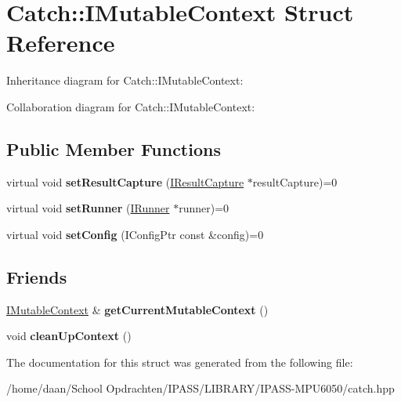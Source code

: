 \hypertarget{structCatch_1_1IMutableContext}{}\section{Catch\+:\+:I\+Mutable\+Context Struct Reference}
\label{structCatch_1_1IMutableContext}


Inheritance diagram for Catch\+:\+:I\+Mutable\+Context\+:


Collaboration diagram for Catch\+:\+:I\+Mutable\+Context\+:
\subsection*{Public Member Functions}
\begin{DoxyCompactItemize}
\item 
\mbox{\label{structCatch_1_1IMutableContext_a4a80afd0525b7def21bee8d9b48f2d39}} 
virtual void {\bfseries set\+Result\+Capture} (\hyperlink{structCatch_1_1IResultCapture}{I\+Result\+Capture} $\ast$result\+Capture)=0
\item 
\mbox{\label{structCatch_1_1IMutableContext_af2e53b1dea4527a2587cff266a730f6e}} 
virtual void {\bfseries set\+Runner} (\hyperlink{structCatch_1_1IRunner}{I\+Runner} $\ast$runner)=0
\item 
\mbox{\label{structCatch_1_1IMutableContext_aa81ba080fce084e9482f20338bc88531}} 
virtual void {\bfseries set\+Config} (I\+Config\+Ptr const \&config)=0
\end{DoxyCompactItemize}
\subsection*{Friends}
\begin{DoxyCompactItemize}
\item 
\mbox{\label{structCatch_1_1IMutableContext_aea4b25692aaf4397cdf630716976f6b8}} 
\hyperlink{structCatch_1_1IMutableContext}{I\+Mutable\+Context} \& {\bfseries get\+Current\+Mutable\+Context} ()
\item 
\mbox{\label{structCatch_1_1IMutableContext_ac07cdb7d744cc8f09672d924324b55fd}} 
void {\bfseries clean\+Up\+Context} ()
\end{DoxyCompactItemize}


The documentation for this struct was generated from the following file\+:\begin{DoxyCompactItemize}
\item 
/home/daan/\+School Opdrachten/\+I\+P\+A\+S\+S/\+L\+I\+B\+R\+A\+R\+Y/\+I\+P\+A\+S\+S-\/\+M\+P\+U6050/catch.\+hpp\end{DoxyCompactItemize}
